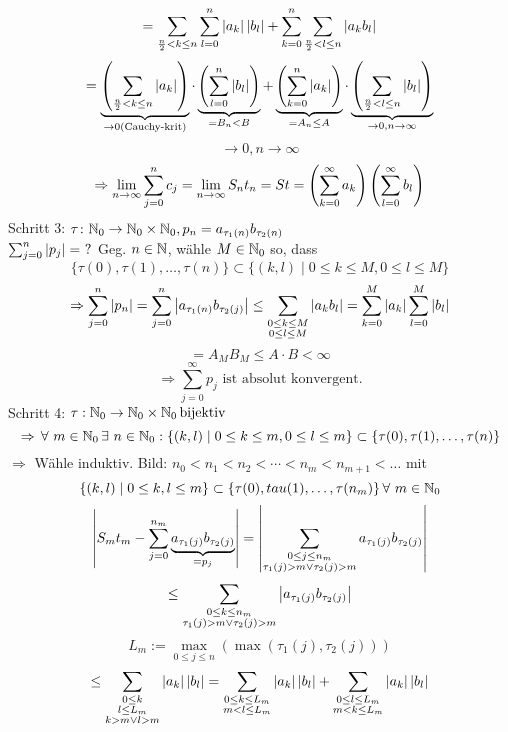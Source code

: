 \documentclass[../ana1.tex]{subfiles}
\begin{document}
\begin{bew}
    \[ = \sum_{\frac{n}{2} < k \leq n} \sum_{l=0}^n \left|a_k\right|\left|b_l\right| + \sum_{k=0}^n \sum_{\frac{n}{2} < l \leq n} \left|a_k b_l\right| \]
    \[ = \underbrace{\left( \sum_{\frac{n}{2} < k \leq n} \left|a_k\right| \right)}_{\rightarrow 0 \text{(Cauchy-krit)}} \cdot \underbrace{\left( \sum_{l=0}^n \left|b_l\right| \right)}_{=B_n < B} + \underbrace{\left( \sum_{k=0}^n \left|a_k\right| \right)}_{=A_n \leq A} \cdot \underbrace{ \left( \sum_{\frac{n}{2} < l \leq n} \left|b_l\right| \right) }_{\rightarrow 0, n\rightarrow\infty} \]
    \[ \rightarrow 0, n\rightarrow\infty \]
    \[ \Rightarrow \lim\limits_{n\rightarrow\infty} \sum_{j=0}^n c_j = \lim\limits_{n\rightarrow\infty} S_n t_n = S t = \left( \sum_{k=0}^\infty a_k \right) \left( \sum_{l=0}^\infty b_l \right) \]
    Schritt 3: \( \tau \colon \mathbb{N}_0 \rightarrow \mathbb{N}_0 \times \mathbb{N}_0, p_n = a_{\tau_1(n)} b_{\tau_2(n)} \) \\
    \( \sum_{j=0}^n \left|p_j\right| = \ ? \)
    Geg. \(n\in\mathbb{N} \), wähle \( M\in\mathbb{N}_0 \) so, dass 
    \[ \{ \tau(0), \tau(1), \ldots, \tau(n) \} \subset \{ (k,l) \; \vert \; 0 \leq k \leq M, 0 \leq l \leq M \} \]
    \[ \Rightarrow \sum_{j=0}^n \left|p_n\right| = \sum_{j=0}^n \left|a_{\tau_1(n)} b_{\tau_2(j)}\right| \leq \sum_{\substack{0\leq k\leq M \\ 0 \leq l \leq M}} \left|a_k b_l\right| = \sum_{k=0}^M \left|a_k\right| \sum_{l=0}^M \left|b_l\right| \] 
    \[ = A_M B_M \leq A \cdot B < \infty \]
    \[ \Rightarrow \sum_{j=0}^\infty p_j \text{ ist absolut konvergent.} \]
    Schritt 4: \( \tau : \mathbb{N}_0 \rightarrow \mathbb{N}_0 \times \mathbb{N}_0 \operatorname{bijektiv} \)
    \[ \Rightarrow \, \forall \, m\in\N_0 \, \exists \, n\in\N_0 : \{ (k,l) \; \vert \; 0\leq k\leq m, 0\leq l\leq m \} \subset \{ \tau(0), \tau(1), \ldots, \tau(n) \} \]
    \( \Rightarrow \) Wähle induktiv. 
    Bild: 
    \( n_0 < n_1 < n_2 < \cdots < n_m < n_{m+1} < \ldots \) mit 
    \[ \{ (k,l) \; \vert \; 0 \leq k, l \leq m \} \subset \{ \tau(0), tau(1), \ldots , \tau(n_m) \} \, \forall \, m\in\N_0 \]
    \[ \left| S_m t_m - \sum_{j=0}^{n_m} \underbrace{ a_{\tau_1(j)} b_{\tau_2(j)} }_{=p_j} \right| = \left| \sum_{\substack{0\leq j\leq n_m \\ \tau_1(j) > m \vee \tau_2(j) > m}} a_{\tau_1(j)} b_{\tau_2(j)} \right| \]
    \[ \leq \sum_{\substack{0\leq k \leq n_m \\ \tau_1(j) > m \vee \tau_2(j) > m}} \left|a_{\tau_1(j)} b_{\tau_2(j)}\right| \]
    \[ L_m := \underset{0\leq j\leq n}{\max}(\max( \tau_1(j), \tau_2(j) ) ) \]
    \[ \leq \sum_{\substack{0\leq k \\ l\leq L_m \\ k > m \vee l > m}} \left|a_k\right| \left|b_l\right| = \sum_{\substack{0\leq k\leq L_m \\ m<l\leq L_m}} \left|a_k\right|\left|b_l\right| + \sum_{\substack{0\leq l \leq L_m \\ m<k\leq L_m}} \left|a_k\right|\left|b_l\right| \]

\end{bew}
\end{document}
